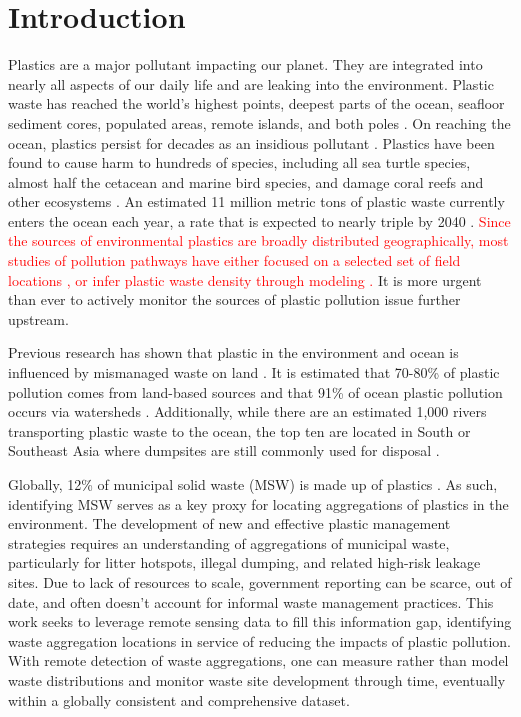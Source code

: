 \documentclass[10pt,letterpaper]{article}
\begin{document}
\linenumbers
\section*{Introduction}
Plastics are a major pollutant impacting our planet. They are integrated into nearly all aspects of our daily life and are leaking into the environment. Plastic waste has reached the world’s highest points, deepest parts of the ocean, seafloor sediment cores, populated areas, remote islands, and both poles \cite{napper2021abundance}\cite{chiba2018human}\cite{kelly2020microplastic}\cite{brandon2019multidecadal}\cite{lavers2020entrapment}\cite{browne2011accumulation}. On reaching the ocean, plastics persist for decades as an insidious pollutant \cite{lebreton2019global}\cite{worm2017plastic}. Plastics have been found to cause harm to hundreds of species, including all sea turtle species, almost half the cetacean and marine bird species, and damage coral reefs and other ecosystems \cite{harding2016marine}\cite{lamb2018plastic}\cite{beaumont2019global}. An estimated 11 million metric tons of plastic waste currently enters the ocean each year, a rate that is expected to nearly triple by 2040 \cite{lau2020evaluating}. \textcolor{red}{Since the sources of environmental plastics are broadly distributed geographically, most studies of pollution pathways have either focused on a selected set of field locations \cite{jambeck2015plastic}, or infer plastic waste density through modeling \cite{lebreton2019future}\cite{SIEGFRIED2017249}.} It is more urgent than ever to actively monitor the sources of plastic pollution issue further upstream.

Previous research has shown that plastic in the environment and ocean is influenced by mismanaged waste on land \cite{jambeck2015plastic}\cite{borrelle2020predicted}. It is estimated that 70-80\% of plastic pollution comes from land-based sources and that 91\% of ocean plastic pollution occurs via watersheds \cite{lebreton2019future}. Additionally, while there are an estimated 1,000 rivers transporting plastic waste to the ocean, the top ten are located in South or Southeast Asia where dumpsites are still commonly used for disposal \cite{meijer2021more}\cite{dhokhikah2012solid}\cite{kaza2018waste}. 

Globally, 12\% of municipal solid waste (MSW) is made up of plastics \cite{kaza2018waste}. As such, identifying MSW serves as a key proxy for locating aggregations of plastics in the environment. The development of new and effective plastic management strategies requires an understanding of aggregations of municipal waste, particularly for litter hotspots, illegal dumping, and related high-risk leakage sites. Due to lack of resources to scale, government reporting can be scarce, out of date, and often doesn’t account for informal waste management practices. This work seeks to leverage remote sensing data to fill this information gap, identifying waste aggregation locations in service of reducing the impacts of plastic pollution. With remote detection of waste aggregations, one can measure rather than model waste distributions and monitor waste site development through time, eventually within a globally consistent and comprehensive dataset.
\end{document}
